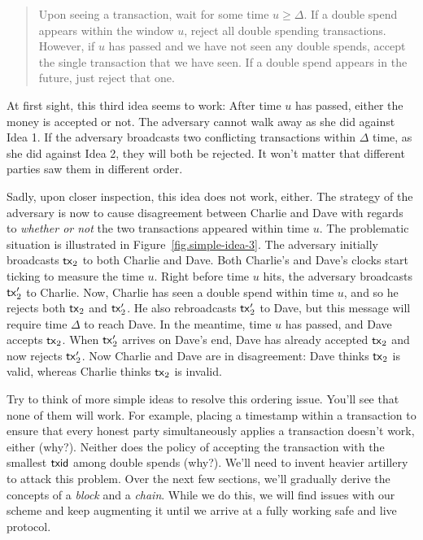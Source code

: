 \begin{quote}
Upon seeing a transaction, wait for some time $u \geq \Delta$. If a double spend
appears within the window $u$, reject all double spending transactions. However, if $u$ has passed and we have
not seen any double spends, accept the single transaction that we have seen. If a double spend appears in
the future, just reject that one.
\end{quote}

At first sight, this third idea seems to work: After time $u$ has passed, either the money is accepted or not.
The adversary cannot walk away as she did against Idea 1. If the adversary broadcasts two conflicting
transactions within $\Delta$ time, as she did against Idea 2, they will both be rejected. It won't matter
that different parties saw them in different order.

Sadly, upon closer inspection, this idea does not work,
either. The strategy of the adversary is now to cause disagreement between Charlie and Dave with
regards to \emph{whether or not} the two transactions appeared within time $u$. The problematic situation
is illustrated in Figure~\ref{fig.simple-idea-3}. The adversary initially broadcasts $\mathsf{tx}_2$
to both Charlie and Dave. Both Charlie's and Dave's clocks start ticking to measure the time $u$.
Right before time $u$ hits, the adversary broadcasts $\mathsf{tx}_2'$ to Charlie. Now, Charlie has seen
a double spend within time $u$, and so he rejects both $\mathsf{tx}_2$ and $\mathsf{tx}_2'$. He also rebroadcasts
$\mathsf{tx}_2'$ to Dave, but this message will require time $\Delta$ to reach Dave. In the meantime,
time $u$ has passed, and Dave accepts $\mathsf{tx}_2$. When $\mathsf{tx}_2'$ arrives on Dave's end, Dave has
already accepted $\mathsf{tx}_2$ and now rejects $\mathsf{tx}_2'$. Now Charlie and Dave are in disagreement:
Dave thinks $\mathsf{tx}_2$ is valid, whereas Charlie thinks $\mathsf{tx}_2$ is invalid.

Try to think of more simple ideas to resolve this ordering issue. You'll see that
none of them will work. For example, placing a timestamp within a transaction to ensure
that every honest party simultaneously applies a transaction doesn't work, either (why?).
Neither does the policy of accepting the transaction with the smallest $\mathsf{txid}$ among
double spends (why?).
We'll need to invent heavier artillery to attack this problem. Over the next few
sections, we'll gradually derive the concepts of a \emph{block} and a \emph{chain}.
While we do this, we will find issues with our scheme and keep augmenting it until
we arrive at a fully working safe and live protocol.


